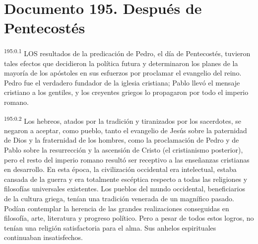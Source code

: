 \chapter{Documento 195. Después de Pentecostés}
\par 
\textsuperscript{195:0.1} LOS resultados de la predicación de Pedro, el día de Pentecostés, tuvieron tales efectos que decidieron la política futura y determinaron los planes de la mayoría de los apóstoles en sus esfuerzos por proclamar el evangelio del reino. Pedro fue el verdadero fundador de la iglesia cristiana; Pablo llevó el mensaje cristiano a los gentiles, y los creyentes griegos lo propagaron por todo el imperio romano.

\par 
\textsuperscript{195:0.2} Los hebreos, atados por la tradición y tiranizados por los sacerdotes, se negaron a aceptar, como pueblo, tanto el evangelio de Jesús sobre la paternidad de Dios y la fraternidad de los hombres, como la proclamación de Pedro y de Pablo sobre la resurrección y la ascensión de Cristo (el cristianismo posterior), pero el resto del imperio romano resultó ser receptivo a las enseñanzas cristianas en desarrollo. En esta época, la civilización occidental era intelectual, estaba cansada de la guerra y era totalmente escéptica respecto a todas las religiones y filosofías universales existentes. Los pueblos del mundo occidental, beneficiarios de la cultura griega, tenían una tradición venerada de un magnífico pasado. Podían contemplar la herencia de las grandes realizaciones conseguidas en filosofía, arte, literatura y progreso político. Pero a pesar de todos estos logros, no tenían una religión satisfactoria para el alma. Sus anhelos espirituales continuaban insatisfechos.

